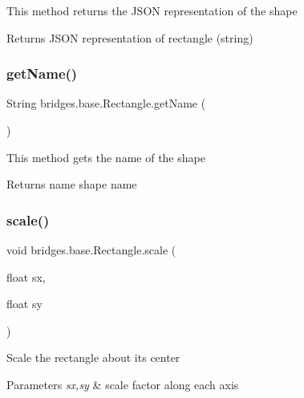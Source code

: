 This method returns the J\+S\+ON representation of the shape

\begin{DoxyReturn}{Returns}
J\+S\+ON representation of rectangle (string) 
\end{DoxyReturn}
\mbox{\label{classbridges_1_1base_1_1_rectangle_ab785b45f264ae3cd61a5a898ffa6afba}} 
\subsubsection{\texorpdfstring{get\+Name()}{getName()}}
{\footnotesize\ttfamily String bridges.\+base.\+Rectangle.\+get\+Name (\begin{DoxyParamCaption}{ }\end{DoxyParamCaption})}

This method gets the name of the shape

\begin{DoxyReturn}{Returns}
name shape name 
\end{DoxyReturn}
\mbox{\label{classbridges_1_1base_1_1_rectangle_ad2612f09cf16cd829efd13007df53f7f}} 
\subsubsection{\texorpdfstring{scale()}{scale()}}
{\footnotesize\ttfamily void bridges.\+base.\+Rectangle.\+scale (\begin{DoxyParamCaption}\item[{float}]{sx,  }\item[{float}]{sy }\end{DoxyParamCaption})}

Scale the rectangle about its center


\begin{DoxyParams}{Parameters}
{\em sx,sy} & scale factor along each axis \\
\hline
\end{DoxyParams}
\mbox{\label{classbridges_1_1base_1_1_rectangle_a267eafb8107ea074598fbf4d2d3dc72d}} 
